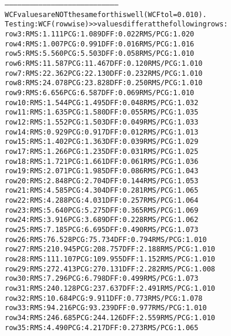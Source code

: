 \begin{alltt}
--------------------------------------------------------------------------------
WCF values are NOT the same for this well (WCF tol = 0.010).
Testing: WCF (rowwise) >> values differ at the following rows:
row   3:  RMS:   1.111    PCG:   1.089    DFF:   0.022    RMS/PCG:   1.020    
row   4:  RMS:   1.007    PCG:   0.991    DFF:   0.016    RMS/PCG:   1.016    
row   5:  RMS:   5.560    PCG:   5.503    DFF:   0.058    RMS/PCG:   1.010    
row   6:  RMS:  11.587    PCG:  11.467    DFF:   0.120    RMS/PCG:   1.010    
row   7:  RMS:  22.362    PCG:  22.130    DFF:   0.232    RMS/PCG:   1.010    
row   8:  RMS:  24.078    PCG:  23.828    DFF:   0.250    RMS/PCG:   1.010    
row   9:  RMS:   6.656    PCG:   6.587    DFF:   0.069    RMS/PCG:   1.010    
row  10:  RMS:   1.544    PCG:   1.495    DFF:   0.048    RMS/PCG:   1.032    
row  11:  RMS:   1.635    PCG:   1.580    DFF:   0.055    RMS/PCG:   1.035    
row  12:  RMS:   1.552    PCG:   1.503    DFF:   0.049    RMS/PCG:   1.033    
row  14:  RMS:   0.929    PCG:   0.917    DFF:   0.012    RMS/PCG:   1.013    
row  15:  RMS:   1.402    PCG:   1.363    DFF:   0.039    RMS/PCG:   1.029    
row  17:  RMS:   1.266    PCG:   1.235    DFF:   0.031    RMS/PCG:   1.025    
row  18:  RMS:   1.721    PCG:   1.661    DFF:   0.061    RMS/PCG:   1.036    
row  19:  RMS:   2.071    PCG:   1.985    DFF:   0.086    RMS/PCG:   1.043    
row  20:  RMS:   2.848    PCG:   2.704    DFF:   0.144    RMS/PCG:   1.053    
row  21:  RMS:   4.585    PCG:   4.304    DFF:   0.281    RMS/PCG:   1.065    
row  22:  RMS:   4.288    PCG:   4.031    DFF:   0.257    RMS/PCG:   1.064    
row  23:  RMS:   5.640    PCG:   5.275    DFF:   0.365    RMS/PCG:   1.069    
row  24:  RMS:   3.916    PCG:   3.689    DFF:   0.228    RMS/PCG:   1.062    
row  25:  RMS:   7.185    PCG:   6.695    DFF:   0.490    RMS/PCG:   1.073    
row  26:  RMS:  76.528    PCG:  75.734    DFF:   0.794    RMS/PCG:   1.010    
row  27:  RMS: 210.945    PCG: 208.757    DFF:   2.188    RMS/PCG:   1.010    
row  28:  RMS: 111.107    PCG: 109.955    DFF:   1.152    RMS/PCG:   1.010    
row  29:  RMS: 272.413    PCG: 270.131    DFF:   2.282    RMS/PCG:   1.008    
row  30:  RMS:   7.296    PCG:   6.798    DFF:   0.499    RMS/PCG:   1.073    
row  31:  RMS: 240.128    PCG: 237.637    DFF:   2.491    RMS/PCG:   1.010    
row  32:  RMS:  10.684    PCG:   9.911    DFF:   0.773    RMS/PCG:   1.078    
row  33:  RMS:  94.216    PCG:  93.239    DFF:   0.977    RMS/PCG:   1.010    
row  34:  RMS: 246.685    PCG: 244.126    DFF:   2.559    RMS/PCG:   1.010    
row  35:  RMS:   4.490    PCG:   4.217    DFF:   0.273    RMS/PCG:   1.065    

\end{alltt}
